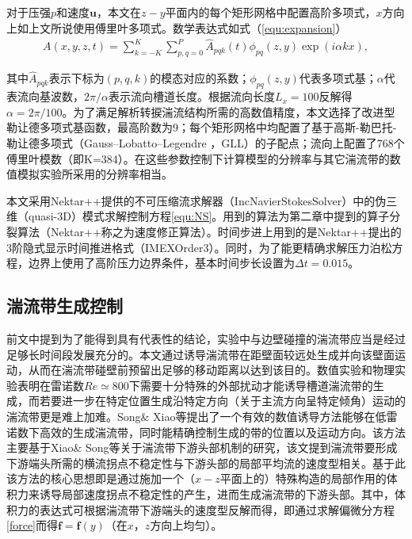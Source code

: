 对于压强$p$和速度$\boldsymbol{u}$，本文在$z-y$平面内的每个矩形网格中配置高阶多项式，$x$方向上如上文所说使用傅里叶多项式。数学表达式如式（\ref{equ:expansion}）
\begin{equation}\label{equ:expansion}
\begin{aligned}
 A(x,y,z,t) = \sum_{k=-K}^K\sum_{p,q=0}^P\hat{A}_{pqk}(t)\phi_{pq}(z,y)\exp(i\alpha kx),
\end{aligned}
\end{equation}

其中$\hat{A}_{pqk}$表示下标为$(p,q,k)$的模态对应的系数；$\phi_{pq}(z,y)$代表多项式基；$\alpha$代表流向基波数，$2\pi/\alpha$表示流向槽道长度。根据流向长度$L_x=100$反解得$\alpha=2\pi/100$。为了满足解析转捩湍流结构所需的高数值精度，本文选择了改进型勒让德多项式基函数，最高阶数为9；每个矩形网格中均配置了基于高斯-勒巴托-勒让德多项式（Gauss–Lobatto–Legendre ，GLL）的子配点；流向上配置了768个傅里叶模数（即K=384）。在这些参数控制下计算模型的分辨率与其它湍流带的数值模拟实验\cite{Tuckerman2014,Tao2018, Xiao2020b}所采用的分辨率相当。

本文采用Nektar++提供的不可压缩流求解器（IncNavierStokesSolver）中的伪三维（quasi-3D）模式求解控制方程\ref{equ:NS}。用到的算法为第二章中提到的算子分裂算法\citep{KARNIADAKIS1991414}（Nektar++称之为速度修正算法）。时间步进上用到的是Nektar++提出的3阶隐式显示时间推进格式（IMEXOrder3）\cite{nektar}。同时，为了能更精确求解压力泊松方程，边界上使用了高阶压力边界条件\cite{KARNIADAKIS1991414}，基本时间步长设置为$\Delta t=0.015$。

\subsection{湍流带生成控制}
前文中提到为了能得到具有代表性的结论，实验中与边壁碰撞的湍流带应当是经过足够长时间段发展充分的。本文通过诱导湍流带在距壁面较远处生成并向该壁面运动，从而在湍流带碰壁前预留出足够的移动距离以达到该目的。数值实验\cite{Tao2018}和物理实验\cite{Paranjape2019, Yimprasert2021}表明在雷诺数$Re\simeq 800$下需要十分特殊的外部扰动\cite{Tao2018}才能诱导槽道湍流带的生成，而若要进一步在特定位置生成沿特定方向（关于主流方向呈特定倾角）运动的湍流带更是难上加难。Song\& Xiao等\cite{Song2020}提出了一个有效的数值诱导方法能够在低雷诺数下高效的生成湍流带，同时能精确控制生成的带的位置以及运动方向。该方法主要基于Xiao\& Song等\cite{Xiao2020}关于湍流带下游头部机制的研究，该文提到湍流带要形成下游端头所需的横流拐点不稳定性与下游头部的局部平均流的速度型相关。基于此该方法的核心思想即是通过施加一个（$x-z$平面上的）特殊构造的局部作用的体积力来诱导局部速度拐点不稳定性的产生，进而生成湍流带的下游头部。其中，体积力的表达式可根据湍流带下游端头的速度型反解而得，即通过求解偏微分方程\ref{force}而得$\boldsymbol{f}=\bm f(y)$（在$x，z$方向上均匀）。

